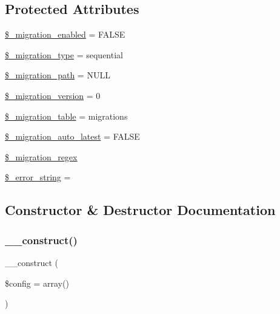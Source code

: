\subsection*{Protected Attributes}
\begin{DoxyCompactItemize}
\item 
\mbox{\hyperlink{class_c_i___migration_a4ab2a6819f2d038b7ad2faa0a09161d1}{\$\+\_\+migration\+\_\+enabled}} = F\+A\+L\+SE
\item 
\mbox{\hyperlink{class_c_i___migration_a74ff9f79bd4a13fec8a3f08bc57ead97}{\$\+\_\+migration\+\_\+type}} = \textquotesingle{}sequential\textquotesingle{}
\item 
\mbox{\hyperlink{class_c_i___migration_a47cd630e42ae345f6e6ebe4235612a2e}{\$\+\_\+migration\+\_\+path}} = N\+U\+LL
\item 
\mbox{\hyperlink{class_c_i___migration_a6bffbb1001557bd7ffb22183b51f589d}{\$\+\_\+migration\+\_\+version}} = 0
\item 
\mbox{\hyperlink{class_c_i___migration_aba6d942d699615d04319339a0d6afac1}{\$\+\_\+migration\+\_\+table}} = \textquotesingle{}migrations\textquotesingle{}
\item 
\mbox{\hyperlink{class_c_i___migration_aabf374ca6bf453ebd07070a5c0dfc16f}{\$\+\_\+migration\+\_\+auto\+\_\+latest}} = F\+A\+L\+SE
\item 
\mbox{\hyperlink{class_c_i___migration_a0010078622b62542cdef48fe64fc519f}{\$\+\_\+migration\+\_\+regex}}
\item 
\mbox{\hyperlink{class_c_i___migration_a2574ed23c2ed6d71d6e8396f0c4fde0f}{\$\+\_\+error\+\_\+string}} = \textquotesingle{}\textquotesingle{}
\end{DoxyCompactItemize}


\subsection{Constructor \& Destructor Documentation}
\mbox{\label{class_c_i___migration_af7f9493844d2d66e924e3c1df51ce616}} 
\subsubsection{\texorpdfstring{\+\_\+\+\_\+construct()}{\_\_construct()}}
{\footnotesize\ttfamily \+\_\+\+\_\+construct (\begin{DoxyParamCaption}\item[{}]{\$config = {\ttfamily array()} }\end{DoxyParamCaption})}


